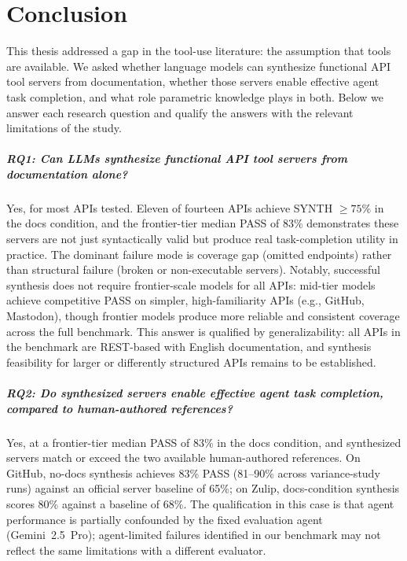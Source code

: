 \chapter{Conclusion}
\label{sec:conclusion}


This thesis addressed a gap in the tool-use literature: the assumption that tools are available. We asked whether language models can synthesize functional API tool servers from documentation, whether those servers enable effective agent task completion, and what role parametric knowledge plays in both. Below we answer each research question and qualify the answers with the relevant limitations of the study.

\paragraph{RQ1: Can LLMs synthesize functional API tool servers from documentation alone?}
Yes, for most APIs tested. Eleven of fourteen APIs achieve SYNTH $\geq 75\%$ in the docs condition, and the frontier-tier median PASS of 83\% demonstrates these servers are not just syntactically valid but produce real task-completion utility in practice. The dominant failure mode is coverage gap (omitted endpoints) rather than structural failure (broken or non-executable servers). Notably, successful synthesis does not require frontier-scale models for all APIs: mid-tier models achieve competitive PASS on simpler, high-familiarity APIs (e.g., GitHub, Mastodon), though frontier models produce more reliable and consistent coverage across the full benchmark. This answer is qualified by generalizability: all APIs in the benchmark are REST-based with English documentation, and synthesis feasibility for larger or differently structured APIs remains to be established.

\paragraph{RQ2: Do synthesized servers enable effective agent task completion, compared to human-authored references?}
Yes, at a frontier-tier median PASS of 83\% in the docs condition, and synthesized servers match or exceed the two available human-authored references. On GitHub, no-docs synthesis achieves 83\% PASS (81--90\% across variance-study runs) against an official server baseline of 65\%; on Zulip, docs-condition synthesis scores 80\% against a baseline of 68\%. The qualification in this case is that agent performance is partially
confounded by the fixed evaluation agent (Gemini~2.5~Pro); agent-limited failures identified in our benchmark may not reflect the same limitations with a different evaluator.

